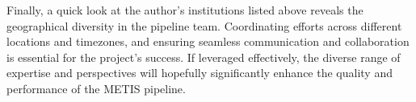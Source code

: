 \documentclass[a4paper]{spie}  %
\begin{document}
Finally, a quick look at the author's institutions listed above reveals the geographical diversity in the pipeline team.
Coordinating efforts across different locations and timezones, and ensuring seamless communication and collaboration is essential for the project's success. 
If leveraged effectively, the diverse range of expertise and perspectives will hopefully significantly enhance the quality and performance of the METIS pipeline.








\end{document}

